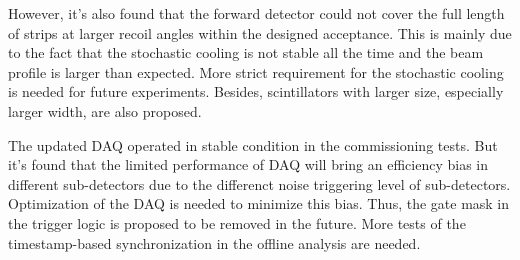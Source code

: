 \documentclass[number,5p]{elsarticle}
\begin{document}
However, it's also found that the forward detector could not cover the full
length of strips at larger recoil angles within the designed acceptance.
This is mainly due to the fact that the stochastic cooling is not stable all the time
and the beam profile is larger than expected.
More strict requirement for the stochastic cooling is needed for future experiments.
Besides, scintillators with larger size, especially larger width, are also proposed.

The updated DAQ operated in stable condition in the commissioning tests.
But it's found that the limited performance of DAQ will bring an efficiency bias in different
sub-detectors due to the differenct noise triggering level of sub-detectors.
Optimization of the DAQ is needed to minimize this bias.
Thus, the gate mask in the trigger logic is proposed to be removed in the future.
More tests of the timestamp-based synchronization in the offline analysis are needed.



\end{document}
